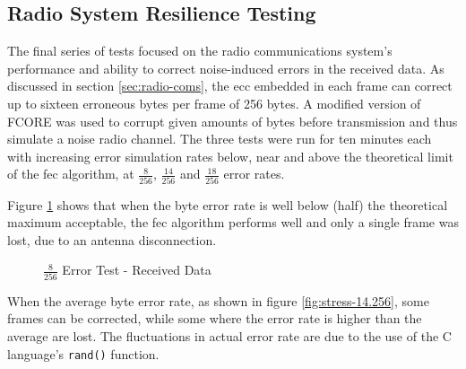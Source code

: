 \subsection{Radio System Resilience Testing}
\label{ssec:results-resilience}

The final series of tests focused on the radio communications system's
performance and ability to correct noise-induced errors in the received data.
As discussed in section \ref{sec:radio-coms}, the \acrfull{ecc} embedded in
each frame can correct up to sixteen erroneous bytes per frame of 256 bytes.
A modified version of FCORE was used to corrupt given amounts of bytes before
transmission and thus simulate a noise radio channel. The three tests were run
for ten minutes each with increasing error simulation rates below, near and
above the theoretical limit of the \acrshort{fec} algorithm, at $\frac{8}{256}$,
$\frac{14}{256}$ and $\frac{18}{256}$ error rates.

Figure \ref{fig:stress-8.256} shows that when the byte error rate is well below
(half) the theoretical maximum acceptable, the \acrshort{fec} algorithm performs
well and only a single frame was lost, due to an antenna disconnection.

\begin{figure}[H]
\centering
\caption{$\frac{8}{256}$ Error Test - Received Data}
\label{fig:stress-8.256}
\end{figure}

When the average byte error rate, as shown in figure \ref{fig:stress-14.256},
some frames can be corrected, while some where the error rate is higher than
the average are lost. The fluctuations in actual error rate are due to the use
of the C language's \texttt{rand()} function. %

